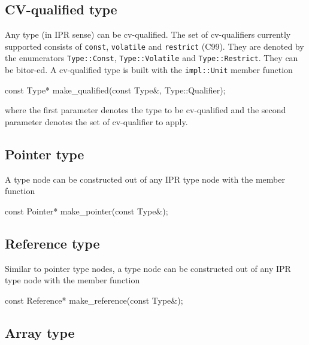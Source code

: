 \documentclass[11pt]{article}
\begin{document}
\subsection{CV-qualified type}
\label{sec:type.cv-qualified}
Any type (in IPR sense) can be cv-qualified.  The set of cv-qualifiers
currently supported consists of \texttt{const}, \texttt{volatile} and
\texttt{restrict} (C99).  They are denoted by the enumerators
\texttt{Type::Const}, \texttt{Type::Volatile} and \texttt{Type::Restrict}.
They can be bitor-ed.  A cv-qualified type is built with the
\texttt{impl::Unit} member function
\begin{Program}
  const Type* make_qualified(const Type&, Type::Qualifier);
\end{Program}
where the first parameter denotes the type to be cv-qualified and the second
parameter denotes the set of cv-qualifier to apply. 

\subsection{Pointer type}
\label{sec:type.pointer}

A  type node can be constructed out of any IPR type node
with the  member function
\begin{Program}
  const Pointer* make_pointer(const Type&);
\end{Program}

\subsection{Reference type}
\label{sec:type.reference}

Similar to pointer type nodes, a  type node can be
constructed out of any IPR type node with the  member
function 
\begin{Program}
  const Reference* make_reference(const Type&);
\end{Program}


\subsection{Array type}
\label{sec:type.array}
\end{document}

